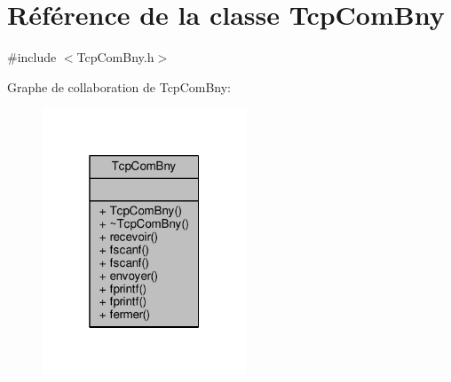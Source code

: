 \hypertarget{classTcpComBny}{}\section{Référence de la classe Tcp\+Com\+Bny}
\label{classTcpComBny}


{\ttfamily \#include $<$Tcp\+Com\+Bny.\+h$>$}



Graphe de collaboration de Tcp\+Com\+Bny\+:
\nopagebreak
\begin{figure}[H]
\begin{center}
\leavevmode
\includegraphics[width=172pt]{classTcpComBny__coll__graph}
\end{center}
\end{figure}

